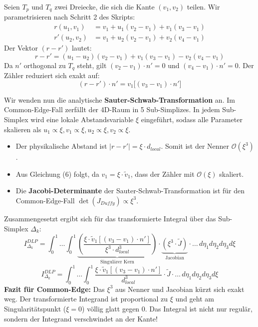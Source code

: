 \documentclass[11pt,a4paper]{article}
\begin{document}
Seien $T_p$ und $T_q$ zwei Dreiecke, die sich die Kante $(v_1, v_2)$ teilen. Wir parametrisieren nach Schritt 2 des Skripts:
\begin{align}
    r(u_1, v_1) &= v_1 + u_1(v_2 - v_1) + v_1(v_3 - v_1) \\
    r'(u_2, v_2) &= v_1 + u_2(v_2 - v_1) + v_2(v_4 - v_1)
\end{align}
Der Vektor $(r - r')$ lautet:
\begin{equation}
    r - r' = (u_1 - u_2)(v_2 - v_1) + v_1(v_3 - v_1) - v_2(v_4 - v_1)
\end{equation}
Da $n'$ orthogonal zu $T_q$ steht, gilt $(v_2 - v_1) \cdot n' = 0$ und $(v_4 - v_1) \cdot n' = 0$. Der Zähler reduziert sich exakt auf:
\begin{equation}
    (r - r') \cdot n' = v_1 \big[ (v_3 - v_1) \cdot n' \big]
\end{equation}

Wir wenden nun die analytische \textbf{Sauter-Schwab-Transformation} an. Im Common-Edge-Fall zerfällt der 4D-Raum in 5 Sub-Simplizes. In jedem Sub-Simplex wird eine lokale Abstandsvariable $\xi$ eingeführt, sodass alle Parameter skalieren als $u_1 \propto \xi, v_1 \propto \xi, u_2 \propto \xi, v_2 \propto \xi$.
\begin{itemize}
    \item Der physikalische Abstand ist $|r - r'| = \xi \cdot d_{local}$. Somit ist der Nenner $\mathcal{O}(\xi^3)$.
    \item Aus Gleichung (6) folgt, da $v_1 = \xi \cdot \tilde{v}_1$, dass der Zähler mit $\mathcal{O}(\xi)$ skaliert.
    \item Die \textbf{Jacobi-Determinante} der Sauter-Schwab-Transformation ist für den Common-Edge-Fall $\det(J_{Duffy}) \propto \xi^3$.
\end{itemize}
Zusammengesetzt ergibt sich für das transformierte Integral über das Sub-Simplex $\Delta_k$:
\begin{equation}
    I_{\Delta_k}^{DLP} = \int_{0}^{1} \dots \int_{0}^{1} \underbrace{\left( \frac{\xi \cdot \tilde{v}_1 [ (v_3 - v_1) \cdot n' ]}{\xi^3 \cdot d_{local}^3} \right)}_{\text{Singulärer Kern}} \cdot \underbrace{(\xi^3 \cdot \tilde{J})}_{\text{Jacobian}} \cdot \dots \, d\eta_1 d\eta_2 d\eta_3 d\xi
\end{equation}
\begin{equation}
    I_{\Delta_k}^{DLP} = \int_{0}^{1} \dots \int_{0}^{1} \frac{\xi \cdot \tilde{v}_1 [ (v_3 - v_1) \cdot n' ]}{d_{local}^3} \cdot \tilde{J} \cdot \dots \, d\eta_1 d\eta_2 d\eta_3 d\xi
\end{equation}
\textbf{Fazit für Common-Edge:} Das $\xi^3$ aus Nenner und Jacobian kürzt sich exakt weg. Der transformierte Integrand ist proportional zu $\xi$ und geht am Singularitätspunkt ($\xi=0$) völlig glatt gegen $0$. Das Integral ist nicht nur regulär, sondern der Integrand verschwindet an der Kante!
\end{document}
